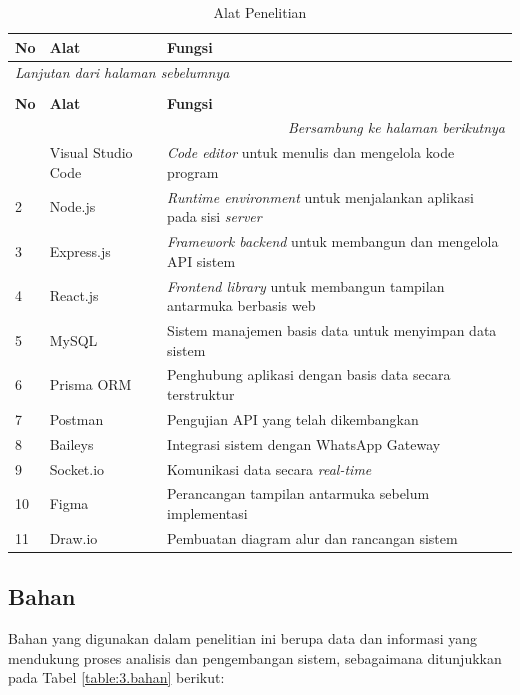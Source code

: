 \begin{longtable}{|p{}|p{}|p{}|}
    \caption{Alat Penelitian}
    \label{table:3.alat}\\
    \hline
    \textbf{No} & \textbf{Alat} & \textbf{Fungsi} \\
    \hline
    \endfirsthead
    \multicolumn{3}{l}{\textit{Lanjutan dari halaman sebelumnya}} \\
    \caption[]{Alat Penelitian} \\
    \hline
    \textbf{No} & \textbf{Alat} & \textbf{Fungsi} \\
    \hline
    \endhead
    \hline
    \multicolumn{3}{r}{\textit{Bersambung ke halaman berikutnya}} \\
    \endfoot
    \endlastfoot
    1 & Visual Studio Code & \textit{Code editor} untuk menulis dan mengelola kode program \\
    \hline
    2 & Node.js & \textit{Runtime environment} untuk menjalankan aplikasi pada sisi \textit{server} \\
    \hline
    3 & Express.js & \textit{Framework backend} untuk membangun dan mengelola API sistem \\
    \hline
    4 & React.js & \textit{Frontend library} untuk membangun tampilan antarmuka berbasis web \\
    \hline
    5 & MySQL & Sistem manajemen basis data untuk menyimpan data sistem \\
    \hline
    6 & Prisma ORM & Penghubung aplikasi dengan basis data secara terstruktur \\
    \hline
    7 & Postman & Pengujian API yang telah dikembangkan \\
    \hline
    8 & Baileys & Integrasi sistem dengan WhatsApp Gateway \\
    \hline
    9 & Socket.io & Komunikasi data secara \textit{real-time} \\
    \hline
    10 & Figma & Perancangan tampilan antarmuka sebelum implementasi \\
    \hline
    11 & Draw.io & Pembuatan diagram alur dan rancangan sistem \\
    \hline
\end{longtable}

\subsection{Bahan} \label{III.Bahan}
Bahan yang digunakan dalam penelitian ini berupa data dan informasi yang mendukung proses analisis dan pengembangan sistem, sebagaimana ditunjukkan pada Tabel \ref{table:3.bahan} berikut:

